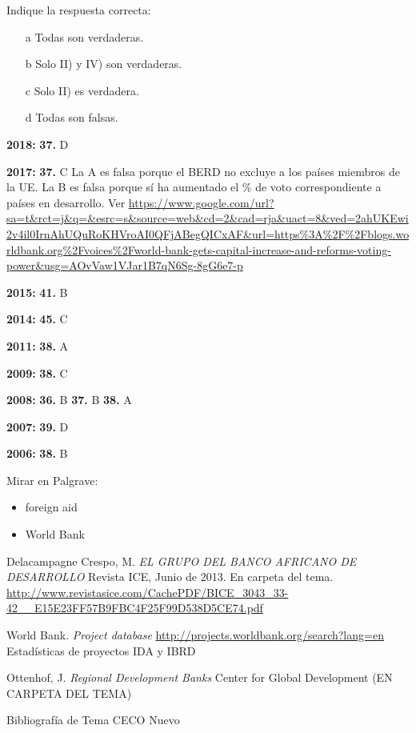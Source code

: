 \documentclass{nuevotema}
\begin{document}
Indique la respuesta correcta:

\begin{itemize}
	\item[a] Todas son verdaderas.
	\item[b] Solo II) y IV) son verdaderas.
	\item[c] Solo II) es verdadera.
	\item[d] Todas son falsas.
\end{itemize}

\notas


\textbf{2018:} \textbf{37.} D

\textbf{2017:} \textbf{37.} C La A es falsa porque el BERD no excluye a los países miembros de la UE. La B es falsa porque sí ha aumentado el \% de voto correspondiente a países en desarrollo. Ver \url{https://www.google.com/url?sa=t&rct=j&q=&esrc=s&source=web&cd=2&cad=rja&uact=8&ved=2ahUKEwi2v4il0IrnAhUQuRoKHVroAI0QFjABegQICxAF&url=https\%3A\%2F\%2Fblogs.worldbank.org\%2Fvoices\%2Fworld-bank-gets-capital-increase-and-reforms-voting-power&usg=AOvVaw1VJar1B7qN6Sg-8gG6e7-p}

\textbf{2015:} \textbf{41.} B

\textbf{2014:} \textbf{45.} C

\textbf{2011:} \textbf{38.} A

\textbf{2009:} \textbf{38.} C

\textbf{2008:} \textbf{36.} B \textbf{37.} B \textbf{38.} A

\textbf{2007:} \textbf{39.} D

\textbf{2006:} \textbf{38.} B

\bibliografia

Mirar en Palgrave:
\begin{itemize}
	\item foreign aid
	\item World Bank
\end{itemize}


Delacampagne Crespo, M. \textit{EL GRUPO DEL BANCO AFRICANO DE DESARROLLO} Revista ICE, Junio de 2013. En carpeta del tema. \url{http://www.revistasice.com/CachePDF/BICE\_3043\_33-42\_\_E15E23FF57B9FBC4F25F99D538D5CE74.pdf}

World Bank. \textit{Project database} \url{http://projects.worldbank.org/search?lang=en} Estadísticas de proyectos IDA y IBRD

Ottenhof, J. \textit{Regional Development Banks} Center for Global Development (EN CARPETA DEL TEMA)

Bibliografía de Tema CECO Nuevo
\end{document}
